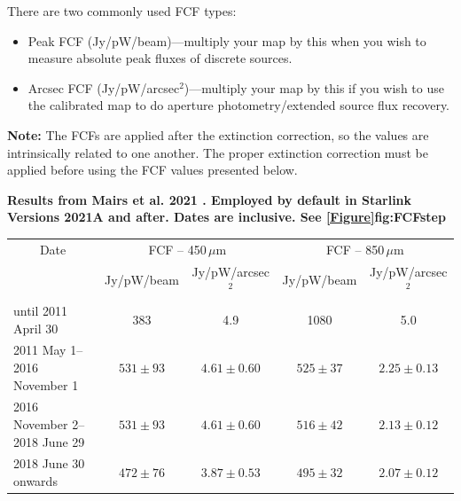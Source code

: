 \vspace{5mm}

There are two commonly used FCF types:
\begin{itemize}
\item Peak FCF (Jy/pW/beam)---multiply your map by this when you wish
to measure absolute peak fluxes of discrete sources.
\item Arcsec FCF (Jy/pW/arcsec$^2$)---multiply your map by this if
you wish to use the calibrated map to do aperture photometry/extended source flux recovery.
\end{itemize}

\textbf{Note:} The FCFs are applied after the extinction correction, so the values are intrinsically
related to one another. The proper extinction correction must be applied before using the FCF
values presented below.

\newpage

\textbf{Results from Mairs et al. 2021 \cite{mairs21}. Employed by
default in Starlink Versions 2021A and after. Dates are inclusive. See
\cref{Figure}{fig:FCFstep}{}}\\
\begin{table}[h!]
\begin{center}
\begin{tabular}{|l|c|c|c|c|}
 \hline
 \multicolumn{1}{|c|}{Date} &
 \multicolumn{2}{c|}{FCF -- 450\,$\mu$m} &
 \multicolumn{2}{c|}{FCF -- 850\,$\mu$m} \\
\cline{2-5}
& Jy/pW/beam &Jy/pW/arcsec$^2$ & Jy/pW/beam &Jy/pW/arcsec$^2$ \\
 \hline
until 2011 April 30           &  383       &  4.9          & 1080       &  5.0 \\
2011 May 1--2016 November 1   & $531\pm93$ & $4.61\pm0.60$ & $525\pm37$ & $2.25\pm0.13$ \\
2016 November 2--2018 June 29 & $531\pm93$ & $4.61\pm0.60$ & $516\pm42$ & $2.13\pm0.12$ \\
2018 June 30 onwards          & $472\pm76$ & $3.87\pm0.53$ & $495\pm32$ & $2.07\pm0.12$ \\
\hline
\end{tabular}
\end{center}
\end{table}


